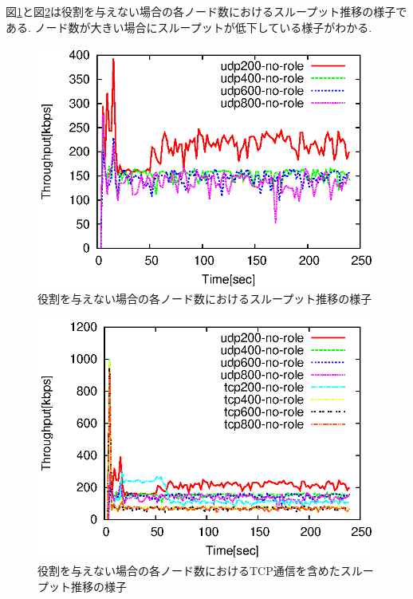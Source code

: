 \documentclass[letter]{ieicej}
\begin{document}
図\ref{fig:fig12}と図\ref{fig:fig13}は役割を与えない場合の各ノード数におけるスループット推移の様子である. ノード数が大きい場合にスループットが低下している様子がわかる.

\begin{figure}[h]
  \begin{center}
    \includegraphics{fig12.eps}
  \end{center}
  \caption{役割を与えない場合の各ノード数におけるスループット推移の様子}
  \label{fig:fig12}
\end{figure}

\begin{figure}[h]
  \begin{center}
    \includegraphics{fig13.eps}
  \end{center}
  \caption{役割を与えない場合の各ノード数におけるTCP通信を含めたスループット推移の様子}
  \label{fig:fig13}
\end{figure}
\end{document}
